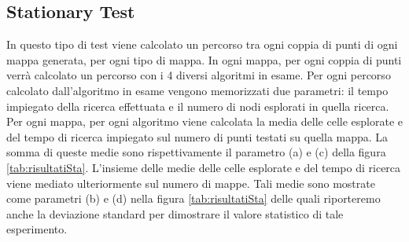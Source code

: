 \documentclass[12pt]{book}
\begin{document}
{\subsection{Stationary Test}

In questo tipo di test viene calcolato un percorso tra ogni coppia di punti di ogni mappa generata, per ogni tipo di mappa. In ogni mappa, per ogni coppia di punti verr\`a calcolato un percorso con i 4 diversi algoritmi in esame. Per ogni percorso calcolato dall'algoritmo in esame vengono memorizzati due parametri: il tempo impiegato della ricerca effettuata e il numero di nodi esplorati in quella ricerca. Per ogni mappa, per ogni algoritmo viene calcolata la media delle celle esplorate e del tempo di ricerca impiegato sul numero di punti testati su quella mappa. La somma di queste medie sono rispettivamente il parametro (a) e (c) della figura \ref{tab:risultatiSta}. L'insieme delle medie delle celle esplorate e del tempo di ricerca viene mediato ulteriormente sul numero di mappe. Tali medie sono mostrate come parametri (b) e (d) nella figura \ref{tab:risultatiSta} delle quali riporteremo anche la deviazione standard per dimostrare il valore statistico di tale esperimento.

\begin{table}[H]
\caption {Risultati Stationary Target Test } \label{tab:risultatiSta} 
\centering

\end{table}}
\end{document}
